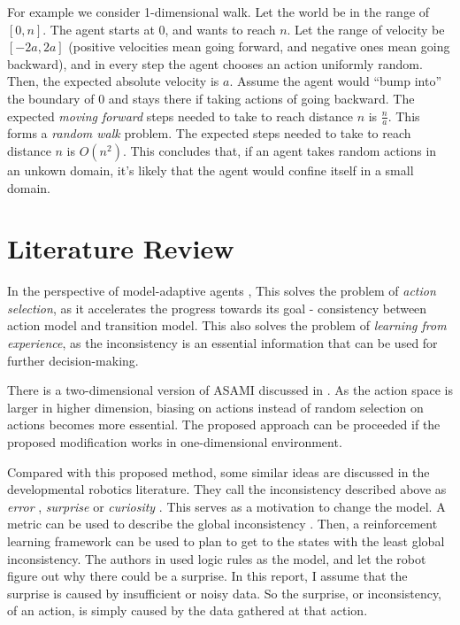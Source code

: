 \documentclass[10pt]{IEEEtran}
\begin{document}
For example we consider 1-dimensional walk. Let the world be in the
range of $[0,n]$. The agent starts at 0, and wants to reach $n$. Let
the range of velocity be $[-2a, 2a]$ (positive velocities mean going
forward, and negative ones mean going backward), and in every step the
agent chooses an action uniformly random.  Then, the expected absolute
velocity is $a$. Assume the agent would ``bump into'' the boundary of
$0$ and stays there if taking actions of going backward. The expected
\textit{moving forward} steps needed to take to reach distance $n$ is
$\frac{n}{a}$. This forms a \textit{random walk}
\cite{motwani1995randomized} problem. The expected steps needed to
take to reach distance $n$ is $O(n^2)$. This concludes that, if an
agent takes random actions in an unkown domain, it's likely that the
agent would confine itself in a small domain.

\section{Literature Review}

In the perspective of model-adaptive agents \cite{maes1993modeling},
This solves the problem of \textit{action selection}, as it
accelerates the progress towards its goal - consistency between action
model and transition model. This also solves the problem of
\textit{learning from experience}, as the inconsistency is an
essential information that can be used for further decision-making.

There is a two-dimensional version of ASAMI discussed in
\cite{ICRA08-stronger}.  As the action space is larger in higher
dimension, biasing on actions instead of random selection on actions
becomes more essential. The proposed approach can be proceeded if the
proposed modification works in one-dimensional environment.

Compared with this proposed method, some similar ideas are discussed
in the developmental robotics literature. They call the inconsistency
described above as \textit{error} \cite{oudeyer2006discovering},
\textit{surprise} \cite{ranasinghe2008surprise} or \textit{curiosity}
\cite{schmidhuber2006developmental}. This serves as a motivation to
change the model. A metric can be used to describe the global
inconsistency \cite{oudeyer2006discovering}. Then, a reinforcement
learning framework can be used to plan to get to the states with the
least global inconsistency. The authors in
\cite{ranasinghe2008surprise} used logic rules as the model, and let
the robot figure out why there could be a surprise. In this report, I
assume that the surprise is caused by insufficient or noisy data. So
the surprise, or inconsistency, of an action, is simply caused by the
data gathered at that action.
\end{document}
